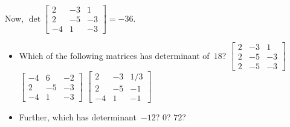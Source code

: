 \begin{activity}
Now, \(\det\begin{bmatrix} 2&-3&1
\\2&-5&-3
\\-4&1&-3 \end{bmatrix}=-36\). 
\begin{itemize}
\item Which of the following matrices has determinant of~\(18\)?
{\(\begin{bmatrix} 2&-3&1
\\2&-5&-3
\\2&-5&-3 \end{bmatrix}\)}
{\(\begin{bmatrix} -4&6&-2
\\2&-5&-3
\\-4&1&-3 \end{bmatrix}\)}
{\(\begin{bmatrix} 2&-3&1/3
\\2&-5&-1
\\-4&1&-1 \end{bmatrix}\)}
\item Further, which has determinant~\(-12\)? \(0\)? \(72\)?
\end{itemize}
\end{activity}



